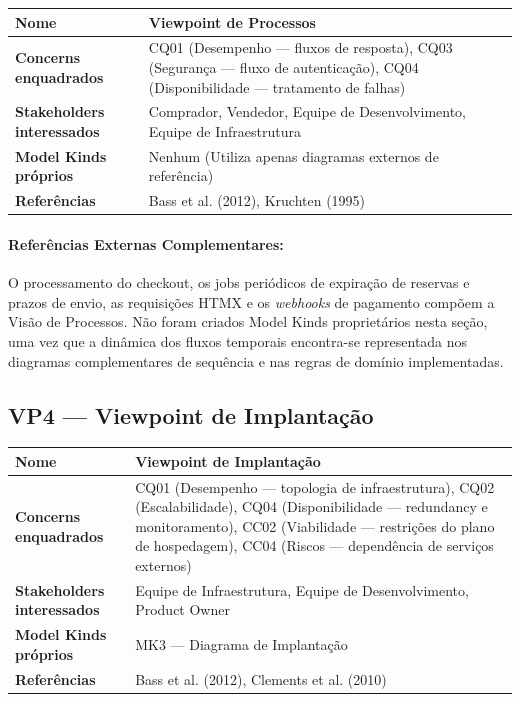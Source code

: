 \documentclass[12pt, a4paper]{article}
\begin{document}
\begin{longtable}{|p{4.5cm}|p{10cm}|}
\hline
\textbf{Nome} & Viewpoint de Processos \\
\hline
\textbf{Concerns enquadrados} & CQ01 (Desempenho --- fluxos de resposta), CQ03 (Segurança --- fluxo de autenticação), CQ04 (Disponibilidade --- tratamento de falhas) \\
\hline
\textbf{Stakeholders interessados} & Comprador, Vendedor, Equipe de Desenvolvimento, Equipe de Infraestrutura \\
\hline
\textbf{Model Kinds próprios} & Nenhum (Utiliza apenas diagramas externos de referência) \\
\hline
\textbf{Referências} & Bass et al. (2012), Kruchten (1995) \\
\hline
\end{longtable}

\paragraph{Referências Externas Complementares:} O processamento do checkout, os jobs periódicos de expiração de reservas e prazos de envio, as requisições HTMX e os \textit{webhooks} de pagamento compõem a Visão de Processos. Não foram criados Model Kinds proprietários nesta seção, uma vez que a dinâmica dos fluxos temporais encontra-se representada nos diagramas complementares de sequência e nas regras de domínio implementadas.

\subsection{VP4 --- Viewpoint de Implantação}

\begin{longtable}{|p{4.5cm}|p{10cm}|}
\hline
\textbf{Nome} & Viewpoint de Implantação \\
\hline
\textbf{Concerns enquadrados} & CQ01 (Desempenho --- topologia de infraestrutura), CQ02 (Escalabilidade), CQ04 (Disponibilidade --- redundancy e monitoramento), CC02 (Viabilidade --- restrições do plano de hospedagem), CC04 (Riscos --- dependência de serviços externos) \\
\hline
\textbf{Stakeholders interessados} & Equipe de Infraestrutura, Equipe de Desenvolvimento, Product Owner \\
\hline
\textbf{Model Kinds próprios} & MK3 --- Diagrama de Implantação \\
\hline
\textbf{Referências} & Bass et al. (2012), Clements et al. (2010) \\
\hline
\end{longtable}
\end{document}
